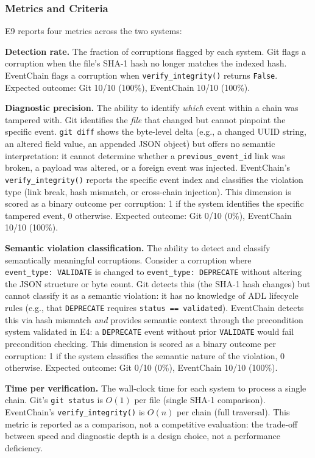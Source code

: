\subsubsection{Metrics and Criteria}\label{metrics-and-criteria}

E9 reports four metrics across the two systems:

\textbf{Detection rate.} The fraction of corruptions flagged by each system. Git flags a corruption when the file's SHA-1 hash no longer matches the indexed hash. EventChain flags a corruption when \texttt{verify\_integrity()} returns \texttt{False}. Expected outcome: Git 10/10 (100\%), EventChain 10/10 (100\%).

\textbf{Diagnostic precision.} The ability to identify \emph{which} event within a chain was tampered with. Git identifies the \emph{file} that changed but cannot pinpoint the specific event. \texttt{git\ diff} shows the byte-level delta (e.g., a changed UUID string, an altered field value, an appended JSON object) but offers no semantic interpretation: it cannot determine whether a \texttt{previous\_event\_id} link was broken, a payload was altered, or a foreign event was injected. EventChain's \texttt{verify\_integrity()} reports the specific event index and classifies the violation type (link break, hash mismatch, or cross-chain injection). This dimension is scored as a binary outcome per corruption: 1 if the system identifies the specific tampered event, 0 otherwise. Expected outcome: Git 0/10 (0\%), EventChain 10/10 (100\%).

\textbf{Semantic violation classification.} The ability to detect and classify semantically meaningful corruptions. Consider a corruption where \texttt{event\_type:\ VALIDATE} is changed to \texttt{event\_type:\ DEPRECATE} without altering the JSON structure or byte count. Git detects this (the SHA-1 hash changes) but cannot classify it as a semantic violation: it has no knowledge of ADL lifecycle rules (e.g., that \texttt{DEPRECATE} requires \texttt{status\ ==\ validated}). EventChain detects this via hash mismatch \emph{and} provides semantic context through the precondition system validated in E4: a \texttt{DEPRECATE} event without prior \texttt{VALIDATE} would fail precondition checking. This dimension is scored as a binary outcome per corruption: 1 if the system classifies the semantic nature of the violation, 0 otherwise. Expected outcome: Git 0/10 (0\%), EventChain 10/10 (100\%).

\textbf{Time per verification.} The wall-clock time for each system to process a single chain. Git's \texttt{git\ status} is \(O(1)\) per file (single SHA-1 comparison). EventChain's \texttt{verify\_integrity()} is \(O(n)\) per chain (full traversal). This metric is reported as a comparison, not a competitive evaluation: the trade-off between speed and diagnostic depth is a design choice, not a performance deficiency.

